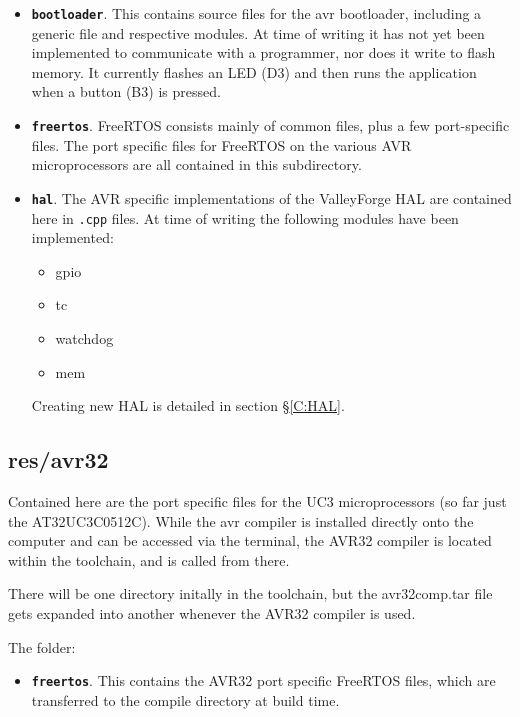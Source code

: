 \documentclass[a4paper, oneside, 11pt, titlepage, onecolumn, openright]{report}
\begin{document}
\begin{itemize}

\item \textbf{\texttt{bootloader}}. This contains source files for the avr bootloader, including a generic file and respective modules. At time of writing it has not yet been implemented to communicate with a programmer, nor does it write to flash memory. It currently flashes an LED (D3) and then runs the application when a button (B3) is pressed.

\item \textbf{\texttt{freertos}}. FreeRTOS consists mainly of common files, plus a few port-specific files. The port specific files for FreeRTOS on the various AVR microprocessors are all contained in this subdirectory.

\item \textbf{\texttt{hal}}. The AVR specific implementations of the ValleyForge HAL are contained here in \texttt{.cpp} files. At time of writing the following modules have been implemented:
\begin{itemize}
\item gpio
\item tc
\item watchdog
\item mem
\end{itemize}

Creating new HAL is detailed in section \S\ref{C:HAL}.

\end{itemize}

\subsection{res/avr32}
			\label{ss:res/avr32}
			
Contained here are the port specific files for the UC3 microprocessors (so far just the AT32UC3C0512C).
While the avr compiler is installed directly onto the computer and can be accessed via the terminal, the AVR32 compiler is located within the toolchain, and is called from there. 

There will be one directory initally in the toolchain, but the avr32comp.tar file gets expanded into another whenever the AVR32 compiler is used.

The folder:

\begin{itemize}

\item \textbf{\texttt{freertos}}. This contains the AVR32 port specific FreeRTOS files, which are transferred to the compile directory at build time.

\end{itemize}
\end{document}
